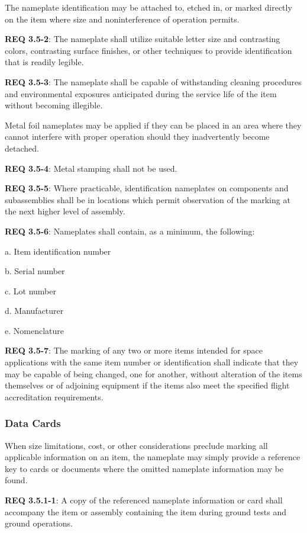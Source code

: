 \documentclass[12pt]{article}
\begin{document}
The nameplate identification may be attached to, etched in, or marked directly on the item where size and noninterference of operation permits. 

\noindent \textbf{REQ 3.5-2}: The nameplate shall utilize suitable letter size and contrasting colors, contrasting surface finishes, or other techniques to provide identification that is readily legible. 

\noindent \textbf{REQ 3.5-3}: The nameplate shall be capable of withstanding cleaning procedures and environmental exposures anticipated during the service life of the item without becoming illegible.

Metal foil nameplates may be applied if they can be placed in an area where they cannot interfere with proper operation should they inadvertently become detached. 

\noindent \textbf{REQ 3.5-4}: Metal stamping shall not be used. 

\noindent \textbf{REQ 3.5-5}: Where practicable, identification nameplates on components and subassemblies shall be in locations which permit observation of the marking at the next higher level of assembly. 

\noindent \textbf{REQ 3.5-6}: Nameplates shall contain, as a minimum, the following:

a. Item identification number

b. Serial number

c. Lot number

d. Manufacturer

e. Nomenclature

\noindent \textbf{REQ 3.5-7}: The marking of any two or more items intended for space applications with the same item number or identification shall indicate that they may be capable of being changed, one for another, without alteration of the items themselves or of adjoining equipment if the items also meet the specified flight accreditation requirements.


\subsubsection{Data Cards} %
When size limitations, cost, or other considerations preclude marking all applicable information on an item, the nameplate may simply provide a reference key to cards or documents where the omitted nameplate information may be found. 

\noindent \textbf{REQ 3.5.1-1}: A copy of the referenced nameplate information or card shall accompany the item or assembly containing the item during ground tests and ground operations.
\end{document}
